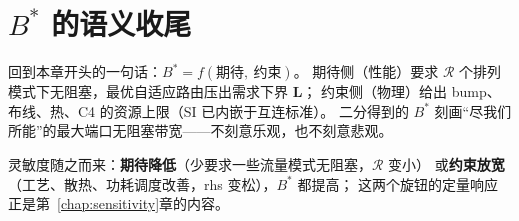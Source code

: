 \section{$B^*$ 的语义收尾}\label{sec:ov-semantics}

回到本章开头的一句话：$B^* = f(\text{期待},\ \text{约束})$。
期待侧（性能）要求 $\mathcal{R}$ 个排列模式下无阻塞，最优自适应路由压出需求下界 $\mathbf{L}$；
约束侧（物理）给出 bump、布线、热、C4 的资源上限（SI 已内嵌于互连标准）。
二分得到的 $B^*$ 刻画``尽我们所能''的最大端口无阻塞带宽——不刻意乐观，也不刻意悲观。

灵敏度随之而来：\textbf{期待降低}（少要求一些流量模式无阻塞，$\mathcal{R}$ 变小）
或\textbf{约束放宽}（工艺、散热、功耗调度改善，rhs 变松），$B^*$ 都提高；
这两个旋钮的定量响应正是第~\ref{chap:sensitivity}章的内容。
